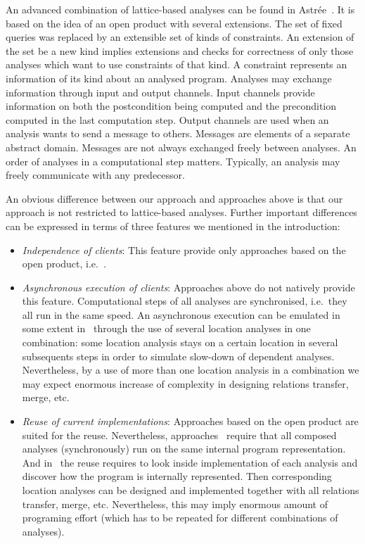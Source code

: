 \documentclass[envcountsame]{llncs}
\begin{document}
An advanced combination of lattice-based analyses can be found in
Astr{\'e}e~\cite{Astree07}. It is based on the idea of an open product with
several extensions. The set of fixed queries was replaced by an extensible set
of kinds of constraints. An extension of the set be a new kind implies
extensions and checks for correctness of only those analyses which want to use
constraints of that kind. A constraint represents an information of its kind
about an analysed program. Analyses may exchange information through input and
output channels. Input channels provide information on both the postcondition
being computed and the precondition computed in the last computation step.
Output channels are used when an analysis wants to send a message to others.
Messages are elements of a separate abstract domain. Messages are not always
exchanged freely between analyses. An order of analyses in a computational step
matters. Typically, an analysis may freely communicate with any predecessor.

An obvious difference between our approach and approaches above is that our
approach is not restricted to lattice-based analyses. Further important
differences can be expressed in terms of three features we mentioned in the
introduction:
\begin{itemize}
\item \emph{Independence of clients}: This feature provide only approaches based
on the open product, i.e.~\cite{OpenProduct,InteractingPlugins,Astree07}. \item \emph{Asynchronous execution of clients}: Approaches above do not natively
provide this feature. Computational steps of all analyses are synchronised,
i.e.~they all run in the same speed. An asynchronous execution can be emulated
in some extent in~\cite{CPA} through the use of several location analyses in one
combination: some location analysis stays on a certain location in several
subsequents steps in order to simulate slow-down of dependent analyses.
Nevertheless, by a use of more than one location analysis in a combination we
may expect enormous increase of complexity in designing relations transfer,
merge, etc. \item \emph{Reuse of current implementations}: Approaches based on the open
product are suited for the reuse. Nevertheless,
approaches~\cite{OpenProduct,InteractingPlugins,Astree07} require that all
composed analyses (synchronously) run on the same internal program
representation. And in~\cite{CPA} the reuse requires to look inside
implementation of each analysis and discover how the program is internally
represented. Then corresponding location analyses can be designed and
implemented together with all relations transfer, merge, etc. Nevertheless, this
may imply enormous amount of programing effort (which has to be repeated for
different combinations of analyses). \end{itemize}
\end{document}
